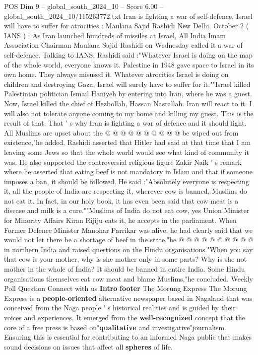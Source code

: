 \begin{textsample}{POS Dim 9 – global\_south\_2024\_10 – Score 6.00 – global\_south\_2024\_10/115263772.txt}  \label{ex:f9_pos_084}
Iran is fighting a war of self-defence, Israel will have to suffer for atrocities : Maulana Sajid Rashidi New Delhi, October 2 ( IANS ) : As Iran launched hundreds of missiles at Israel, All India Imam Association Chairman Maulana Sajid Rashidi on Wednesday called it a war of self-defence.
Talking to IANS, Rashidi said :"Whatever Israel is doing on the map of the whole world, everyone knows it.
Palestine in 1948 gave space to Israel in its own home.
They always misused it.
Whatever atrocities Israel is doing on children and destroying Gaza, Israel will surely have to suffer for it.""Israel killed Palestinian politician Ismail Haniyeh by entering into Iran, where he was a guest.
Now, Israel killed the chief of Hezbollah, Hassan Nasrallah.
Iran will react to it.
I will also not tolerate anyone coming to my home and killing my guest.
This is the result of that.
That ' s why Iran is fighting a war of defence and it should fight.
All Muslims are upset about the @ @ @ @ @ @ @ @ @ @ be wiped out from existence,"he added.
Rashidi asserted that Hitler had said at that time that I am leaving some Jews so that the whole world would see what kind of community it was.
He also supported the controversial religious figure Zakir Naik ' s remark where he asserted that eating beef is not mandatory in Islam and that if someone imposes a ban, it should be followed.
He said :"Absolutely everyone is respecting it, all the people of India are respecting it, wherever cow is banned, Muslims do not eat it.
In fact, in our holy book, it has even been said that cow meat is a disease and milk is a cure.""Muslims of India do not eat cow, yes Union Minister for Minority Affairs Kiran Rijiju eats it, he accepts in the parliament.
When Former Defence Minister Manohar Parrikar was alive, he had clearly said that we would not let there be a shortage of beef in the state,"he @ @ @ @ @ @ @ @ @ @ in northern India and raised questions on the Hindu organisations."When you say that cow is your mother, why is she mother only in some parts?
Why is she not mother in the whole of India?
It should be banned in entire India.
Some Hindu organisations themselves eat cow meat and blame Muslims,"he concluded.
Weekly Poll Question Connect with us \textbf{Intro} \textbf{footer} The Morung Express The Morung Express is a \textbf{people-oriented} alternative newspaper based in Nagaland that was conceived from the Naga people ' s historical realities and is guided by their voices and experiences.
It emerged from the \textbf{well-recognized} concept that the core of a free press is based on"\textbf{qualitative} and investigative"journalism.
Ensuring this is essential for contributing to an informed Naga public that makes sound decisions on issues that affect all \textbf{spheres} of life.

\end{textsample}
